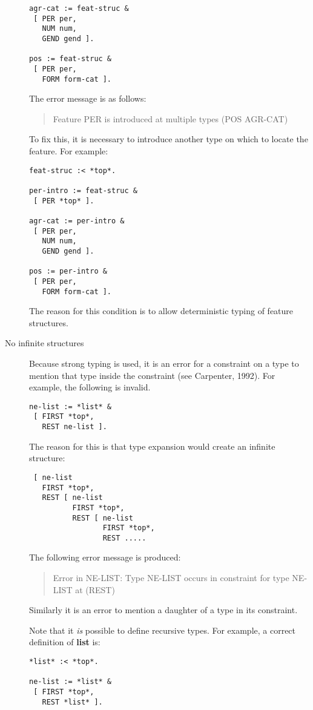 \documentclass[12pt]{report}
\newenvironment{error}%
{\begin{quote}
\tt
}%
{\end{quote}
}
\begin{document}
\begin{description}
\begin{verbatim}
agr-cat := feat-struc &
 [ PER per,
   NUM num,
   GEND gend ].

pos := feat-struc &
 [ PER per,
   FORM form-cat ].
\end{verbatim}
The error message is as follows:
\begin{error}
Feature PER is introduced at multiple types (POS AGR-CAT)
\end{error} 
To fix this, it is necessary to introduce another type on which to
locate the feature.  For example:
\begin{verbatim}
feat-struc :< *top*.

per-intro := feat-struc &
 [ PER *top* ].

agr-cat := per-intro &
 [ PER per,
   NUM num,
   GEND gend ].

pos := per-intro &
 [ PER per,
   FORM form-cat ].
\end{verbatim}

The reason for this condition is to allow deterministic 
typing of feature structures.                      
\item[No infinite structures]
Because strong typing is used, it is an error for a constraint on a type
to mention that type inside the constraint (see Carpenter, 1992).  
For example, the following is
invalid.
\begin{verbatim}
ne-list := *list* &
 [ FIRST *top*,
   REST ne-list ].
\end{verbatim}
The reason for this is that type expansion would create an infinite 
structure:
\begin{verbatim}
 [ ne-list
   FIRST *top*,
   REST [ ne-list
          FIRST *top*,
          REST [ ne-list
                 FIRST *top*,
                 REST .....
\end{verbatim}
The following error message is produced:
\begin{error}
Error in NE-LIST: 
  Type NE-LIST occurs in constraint for type NE-LIST at (REST)
\end{error}
Similarly it is an error to mention a daughter of a type in its
constraint.

Note that it {\em is} 
possible to define recursive types.  For example, a correct
definition of {\bf list} is:
\begin{verbatim} 
*list* :< *top*.

ne-list := *list* &
 [ FIRST *top*,
   REST *list* ].


\end{verbatim}
\end{description}
\end{document}
